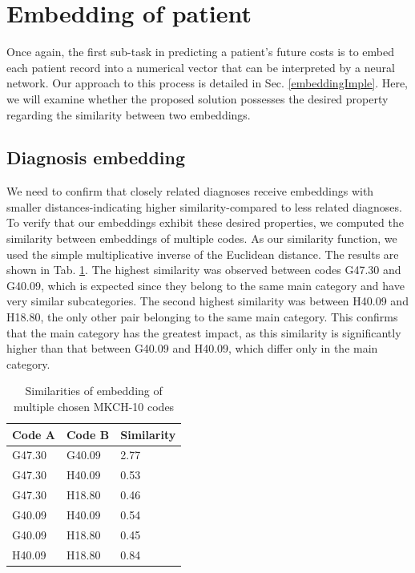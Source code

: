 
\section{Embedding of patient}
\label{embeddingRes}

Once again, the first sub-task in predicting a patient’s future costs is to embed each patient record into a numerical vector that can be interpreted by a neural network. Our approach to this process is detailed in Sec. \ref{embeddingImple}. Here, we will examine whether the proposed solution possesses the desired property regarding the similarity between two embeddings.

\subsection{Diagnosis embedding}

We need to confirm that closely related diagnoses receive embeddings with smaller distances-indicating higher similarity-compared to less related diagnoses. To verify that our embeddings exhibit these desired properties, we computed the similarity between embeddings of multiple codes. As our similarity function, we used the simple multiplicative inverse of the Euclidean distance. The results are shown in Tab. \ref{tab:diag_emb_show}. The highest similarity was observed between codes G47.30 and G40.09, which is expected since they belong to the same main category and have very similar subcategories. The second highest similarity was between H40.09 and H18.80, the only other pair belonging to the same main category. This confirms that the main category has the greatest impact, as this similarity is significantly higher than that between G40.09 and H40.09, which differ only in the main category.
\\

\begin{table}[!h]
	\centering
	\begin{tabular}{|l|l|l|}
		\hline
		Code A & Code B & Similarity \\ \hline
		G47.30 & G40.09 & 2.77       \\ \hline
		G47.30 & H40.09 & 0.53       \\ \hline
		G47.30 & H18.80 & 0.46       \\ \hline
		G40.09 & H40.09 & 0.54       \\ \hline
		G40.09 & H18.80 & 0.45       \\ \hline
		H40.09 & H18.80 & 0.84       \\ \hline
	\end{tabular}
	\caption{Similarities of embedding of multiple chosen MKCH-10 codes}
	\label{tab:diag_emb_show}
\end{table}  

